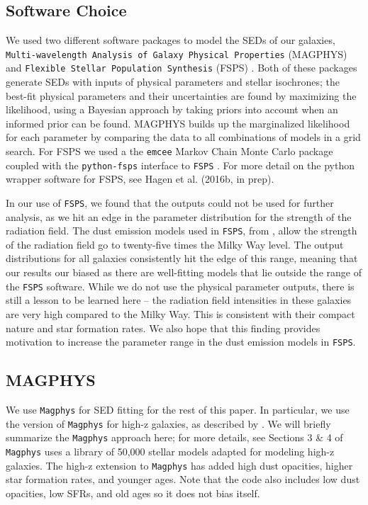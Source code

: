 \documentclass[preprint,natbib209]{aastex}
\begin{document}
\subsection{Software Choice}
We used two different software packages to model the SEDs of our galaxies, \texttt{Multi-wavelength Analysis of Galaxy Physical Properties} (MAGPHYS) \citep{dacunha08, dacunha15} and \texttt{Flexible Stellar Population Synthesis} (FSPS) \citep{conroy09, conroy10}. Both of these packages generate SEDs with inputs of physical parameters and stellar isochrones; the best-fit physical parameters and their uncertainties are found by maximizing the likelihood, using a Bayesian approach by taking priors into account when an informed prior can be found. MAGPHYS builds up the marginalized likelihood for each parameter by comparing the data to all combinations of models in a grid search. For FSPS we used a the \texttt{emcee} Markov Chain Monte Carlo package \citep{emcee} coupled with the \texttt{python-fsps} interface to \texttt{FSPS} \citep{python-fsps}. For more detail on the python wrapper software for FSPS, see Hagen et al. (2016b, in prep). 

In our use of \texttt{FSPS}, we found that the outputs could not be used for further analysis, as we hit an edge in the parameter distribution for the strength of the radiation field. The dust emission models used in \texttt{FSPS}, from \cite{draine07}, allow the strength of the radiation field go to twenty-five times the Milky Way level. The output distributions for all galaxies consistently hit the edge of this range, meaning that our results our biased as there are well-fitting models that lie outside the range of the \texttt{FSPS} software. While we do not use the physical parameter outputs, there is still a lesson to be learned here -- the radiation field intensities in these galaxies are very high compared to the Milky Way. This is consistent with their compact nature and star formation rates. We also hope that this finding provides motivation to increase the parameter range in the dust emission models in \texttt{FSPS}.

\subsection{MAGPHYS}

We use \texttt{Magphys} for SED fitting for the rest of this paper. In particular, we use the version of \texttt{Magphys} for high-z galaxies, as described by \cite{dacunha15}.  We will briefly summarize the \texttt{Magphys} approach here; for more details, see Sections 3 \& 4 of \cite{dacunha15} 
\texttt{Magphys} uses a library of 50,000 stellar models adapted for modeling high-z galaxies. The \cite{dacunha15} high-z extension to \texttt{Magphys} has added high dust opacities, higher star formation rates, and younger ages. Note that the code also includes low dust opacities, low SFRs, and old ages so it does not bias itself. 
\end{document}
